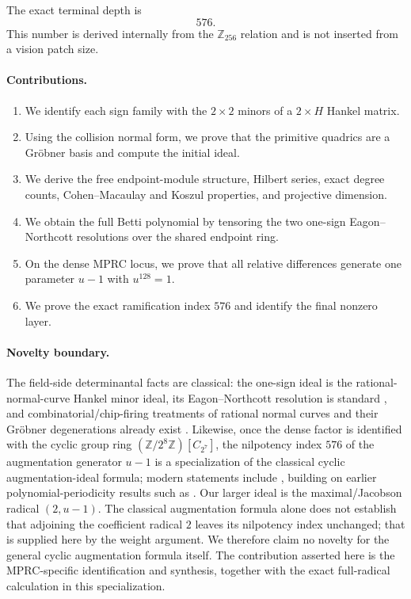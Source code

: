 \documentclass[11pt]{article}
\theoremstyle{definition}
\newcommand{\Z}{\mathbb{Z}}
\begin{document}
The exact terminal depth is
\[
576.
\]
This number is derived internally from the $\Z_{256}$ relation and is not inserted from a vision patch size.

\paragraph{Contributions.}
\begin{enumerate}[leftmargin=*]
\item We identify each sign family with the $2\times2$ minors of a $2\times H$ Hankel matrix.
\item Using the collision normal form, we prove that the primitive quadrics are a Gröbner basis and compute the initial ideal.
\item We derive the free endpoint-module structure, Hilbert series, exact degree counts, Cohen--Macaulay and Koszul properties, and projective dimension.
\item We obtain the full Betti polynomial by tensoring the two one-sign Eagon--Northcott resolutions over the shared endpoint ring.
\item On the dense MPRC locus, we prove that all relative differences generate one parameter $u-1$ with $u^{128}=1$.
\item We prove the exact ramification index $576$ and identify the final nonzero layer.
\end{enumerate}

\paragraph{Novelty boundary.}
The field-side determinantal facts are classical: the one-sign ideal is the rational-normal-curve Hankel minor ideal, its Eagon--Northcott resolution is standard \cite{EagonNorthcott1962}, and combinatorial/chip-firing treatments of rational normal curves and their Gröbner degenerations already exist \cite{KarkiManjunath2023}. Likewise, once the dense factor is identified with the cyclic group ring $(\Z/2^8\Z)[C_{2^7}]$, the nilpotency index $576$ of the augmentation generator $u-1$ is a specialization of the classical cyclic augmentation-ideal formula; modern statements include \cite{Schauz2021}, building on earlier polynomial-periodicity results such as \cite{Wilson2006}. Our larger ideal is the maximal/Jacobson radical $(2,u-1)$. The classical augmentation formula alone does not establish that adjoining the coefficient radical $2$ leaves its nilpotency index unchanged; that is supplied here by the weight argument. We therefore claim no novelty for the general cyclic augmentation formula itself. The contribution asserted here is the MPRC-specific identification and synthesis, together with the exact full-radical calculation in this specialization.
\end{document}
